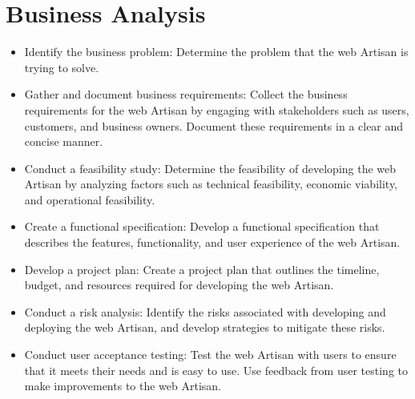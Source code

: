 \documentclass[12pt,a4paper]{article}
\begin{document}
\section{Business Analysis}
\begin{itemize}
    \item Identify the business problem: Determine the problem that the web Artisan is trying to solve. 
    \item Gather and document business requirements: Collect the business requirements for the web Artisan by engaging with stakeholders such as users, customers, and business owners. Document these requirements in a clear and concise manner.
    \item Conduct a feasibility study: Determine the feasibility of developing the web Artisan by analyzing factors such as technical feasibility, economic viability, and operational feasibility.
    \item Create a functional specification: Develop a functional specification that describes the features, functionality, and user experience of the web Artisan. 
    \item Develop a project plan: Create a project plan that outlines the timeline, budget, and resources required for developing the web Artisan. 
    \item Conduct a risk analysis: Identify the risks associated with developing and deploying the web Artisan, and develop strategies to mitigate these risks.
    \item Conduct user acceptance testing: Test the web Artisan with users to ensure that it meets their needs and is easy to use. Use feedback from user testing to make improvements to the web Artisan.
\end{itemize}
\end{document}
